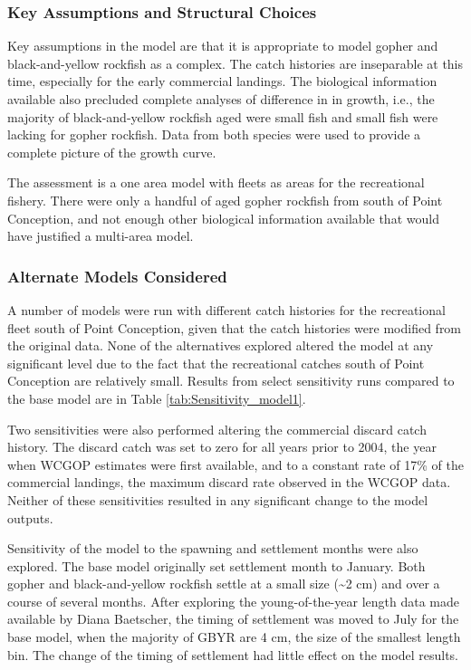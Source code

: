 \documentclass[12pt,]{article}
\begin{document}
\subsubsection{Key Assumptions and Structural
Choices}\label{key-assumptions-and-structural-choices}

Key assumptions in the model are that it is appropriate to model gopher
and black-and-yellow rockfish as a complex. The catch histories are
inseparable at this time, especially for the early commercial landings.
The biological information available also precluded complete analyses of
difference in in growth, i.e., the majority of black-and-yellow rockfish
aged were small fish and small fish were lacking for gopher rockfish.
Data from both species were used to provide a complete picture of the
growth curve.

The assessment is a one area model with fleets as areas for the
recreational fishery. There were only a handful of aged gopher rockfish
from south of Point Conception, and not enough other biological
information available that would have justified a multi-area model.

\subsubsection{Alternate Models
Considered}\label{alternate-models-considered}

A number of models were run with different catch histories for the
recreational fleet south of Point Conception, given that the catch
histories were modified from the original data. None of the alternatives
explored altered the model at any significant level due to the fact that
the recreational catches south of Point Conception are relatively small.
Results from select sensitivity runs compared to the base model are in
Table \ref{tab:Sensitivity_model1}.

Two sensitivities were also performed altering the commercial discard
catch history. The discard catch was set to zero for all years prior to
2004, the year when WCGOP estimates were first available, and to a
constant rate of 17\% of the commercial landings, the maximum discard
rate observed in the WCGOP data. Neither of these sensitivities resulted
in any significant change to the model outputs.

Sensitivity of the model to the spawning and settlement months were also
explored. The base model originally set settlement month to January.
Both gopher and black-and-yellow rockfish settle at a small size
(\textasciitilde{}2 cm) and over a course of several months. After
exploring the young-of-the-year length data made available by Diana
Baetscher, the timing of settlement was moved to July for the base
model, when the majority of GBYR are 4 cm, the size of the smallest
length bin. The change of the timing of settlement had little effect on
the model results.
\end{document}
